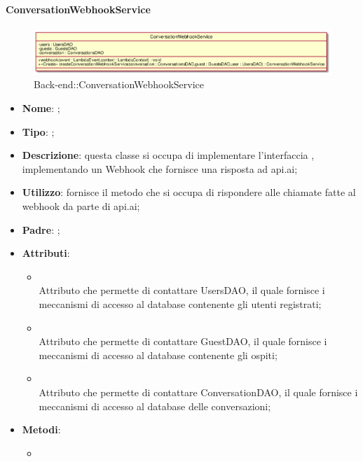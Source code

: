 \hypertarget{ConversationWebhookService_label}{\paragraph{ConversationWebhookService}}
\begin{figure}[h]
	\centering
	\includegraphics[width=\textwidth,height=\textheight,keepaspectratio]{images/ClassConversationWebhookService.png}
	\caption{Back-end::ConversationWebhookService}
\end{figure}
\begin{itemize}
	\item \textbf{Nome}: ;
	\item \textbf{Tipo}: ;
	\item \textbf{Descrizione}: questa classe si occupa di implementare l'interfaccia , implementando un Webhook che fornisce una risposta ad api.ai;
	\item \textbf{Utilizzo}: fornisce il metodo che si occupa di rispondere alle chiamate fatte al webhook da parte di api.ai;
	\item \textbf{Padre}: ;
	\item \textbf{Attributi}:
	\begin{itemize}
		\item[]  \\
		Attributo che permette di contattare UsersDAO, il quale fornisce i meccanismi di accesso al database contenente gli utenti registrati;
		\item[]  \\
		Attributo che permette di contattare GuestDAO, il quale fornisce i meccanismi di accesso al database contenente gli ospiti;
		\item[]  \\
		Attributo che permette di contattare ConversationDAO, il quale fornisce i meccanismi di accesso al database delle conversazioni;
	\end{itemize}
	\item \textbf{Metodi}:
	\begin{itemize}
		\item[]  \\

\end{itemize}
\end{itemize}
